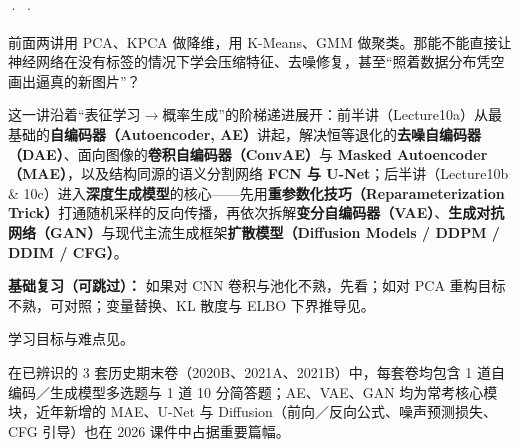 



 ·  · 

前面两讲用 PCA、KPCA 做降维，用 K-Means、GMM 做聚类。那能不能直接让神经网络在没有标签的情况下学会压缩特征、去噪修复，甚至“照着数据分布凭空画出逼真的新图片”？

这一讲沿着“表征学习\ensuremath{\to}概率生成”的阶梯递进展开：前半讲（Lecture10a）从最基础的\textbf{自编码器（Autoencoder, AE）}讲起，解决恒等退化的\textbf{去噪自编码器（DAE）}、面向图像的\textbf{卷积自编码器（ConvAE）}与 \textbf{Masked Autoencoder（MAE）}，以及结构同源的语义分割网络 \textbf{FCN 与 U-Net}；后半讲（Lecture10b \& 10c）进入\textbf{深度生成模型}的核心——先用\textbf{重参数化技巧（Reparameterization Trick）}打通随机采样的反向传播，再依次拆解\textbf{变分自编码器（VAE）}、\textbf{生成对抗网络（GAN）}与现代主流生成框架\textbf{扩散模型（Diffusion Models / DDPM / DDIM / CFG）}。

\textbf{基础复习（可跳过）：} 如果对 CNN 卷积与池化不熟，先看；如对 PCA 重构目标不熟，可对照；变量替换、KL 散度与 ELBO 下界推导见。

学习目标与难点见。



在已辨识的 3 套历史期末卷（2020B、2021A、2021B）中，每套卷均包含 1 道自编码／生成模型多选题与 1 道 10 分简答题；AE、VAE、GAN 均为常考核心模块，近年新增的 MAE、U-Net 与 Diffusion（前向／反向公式、噪声预测损失、CFG 引导）也在 2026 课件中占据重要篇幅。

